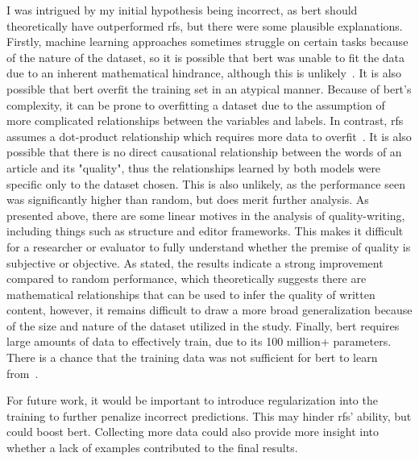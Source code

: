 I was intrigued by my initial hypothesis being incorrect, as \acrshort{bert} should theoretically have outperformed \acrshort{rfs}, but there were some plausible explanations. Firstly, machine learning approaches sometimes struggle on certain tasks because of the nature of the dataset, so it is possible that \acrshort{bert} was unable to fit the data due to an inherent mathematical hindrance, although this is unlikely~\parencite{domingos2012few}. It is also possible that \acrshort{bert} overfit the training set in an atypical manner. Because of \acrshort{bert}'s complexity, it can be prone to overfitting a dataset due to the assumption of more complicated relationships between the variables and labels. In contrast, \acrlong{rfs} assumes a dot-product relationship which requires more data to overfit~\parencite{domingos2012few}. It is also possible that there is no direct causational relationship between the words of an article and its "quality", thus the relationships learned by both models were specific only to the dataset chosen. This is also unlikely, as the performance seen was significantly higher than random, but does merit further analysis. As presented above, there are some linear motives in the analysis of quality-writing, including things such as structure and editor frameworks. This makes it difficult for a researcher or evaluator to fully understand whether the premise of quality is subjective or objective. As stated, the results indicate a strong improvement compared to random performance, which theoretically suggests there are mathematical relationships that can be used to infer the quality of written content, however, it remains difficult to draw a more broad generalization because of the size and nature of the dataset utilized in the study. Finally, \acrshort{bert} requires large amounts of data to effectively train, due to its 100 million+ parameters. There is a chance that the training data was not sufficient for \acrshort{bert} to learn from~\parencite{gonzlezcarvajal2020comparing}.

For future work, it would be important to introduce regularization into the training to further penalize incorrect predictions. This may hinder \acrshort{rfs}' ability, but could boost \acrshort{bert}. Collecting more data could also provide more insight into whether a lack of examples contributed to the final results.